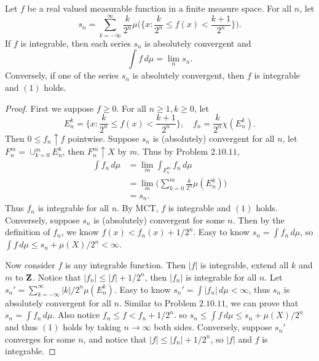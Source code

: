 \begin{pro}%
	Let $f$ be a real valued measurable function in a finite measure space. For all $n$, let
	\[s_n=\sum_{k=-\infty}^{\infty} \frac{k}{2^n}\mu\bigg(\Big\{x\colon \frac{k}{2^n}\leq f(x)<\frac{k+1}{2^n}\Big\}\bigg).\]
	If $f$ is integrable, then each series $s_n$ is absolutely convergent and
	\[\int f\,d\mu=\lim_n s_n.\tag{1}\]Conversely, if one of the series $s_n$ is absolutely convergent, then $f$ is integrable and $(1)$ holds.
\end{pro}
\begin{proof}
	First we suppose $f\geq 0$. For all $n\geq 1,k\geq 0$, let
	\[E_n^k=\bigg\{x\colon \frac{k}{2^n}\leq f(x)<\frac{k+1}{2^n}\bigg\},\quad f_n=\frac{k}{2^n}\chi(E_n^k).\]
	Then $0\leq f_n\uparrow f$ pointwise. Suppose $s_n$ is (absolutely) convergent for all $n$, let $F_n^m=\cup_{k=0}^m E_n^k$, then $F_n^m\uparrow X$ by $m$. Thus by Problem $2.10.11$, 
	\begin{align*}
	\int f_n\,d\mu&=\lim_m\int_{F_n^m} f_n\,d\mu\\
	&=\lim_m\bigg(\sum_{k=0}^m \frac{k}{2^n}\mu(E_n^k)\bigg)\\
	&=s_n.
	\end{align*}
	Thus $f_n$ is integrable for all $n$. By MCT, $f$ is integrable and $(1)$ holds. Conversely, suppose $s_n$ is (absolutely) convergent for some $n$. Then by the definition of $f_n$, we know $f(x)<f_n(x)+1/2^n$. Easy to know $s_n=\int f_n\,d\mu$, so $\int f\,d\mu\leq s_n+\mu(X)/2^n<\infty$.

	Now consider $f$ is any integrable function. Then $|f|$ is integrable, extend all $k$ and $m$ to $\mathbf{Z}$. Notice that $|f_n|\leq |f|+1/2^n$, then $|f_n|$ is integrable for all $n$. Let $s_n'=\sum_{k=-\infty}^{\infty} |k|/2^n\mu(E_n^k)$.
	Easy to know $s_n'=\int |f_n|\,d\mu<\infty$, thus $s_n$ is absolutely convergent for all $n$. Similar to Problem $2.10.11$, we can prove that $s_n=\int f_n\,d\mu$. Also notice $f_n\leq f<f_n+1/2^n$. so $s_n\leq \int f\,d\mu\leq s_n+\mu(X)/2^n$ and thus $(1)$ holds by taking $n\to\infty$ both sides. Conversely, suppose $s_n'$ converges for some $n$, and notice that $|f|\leq |f_n|+1/2^n$, so $|f|$ and $f$ is integrable.
\end{proof}

